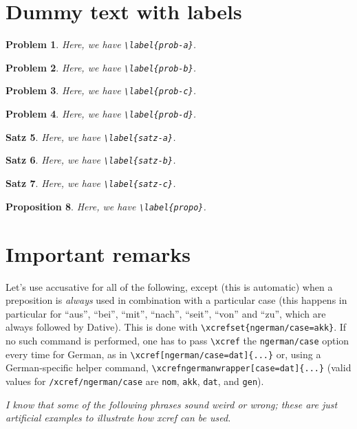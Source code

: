 \documentclass[ngerman]{article}
\newtheorem{problem}{Problem}
\newtheorem{satz}[problem]{Satz}
\newtheorem{proposition}[problem]{Proposition}
\begin{document}
\section{Dummy text with labels}
\label{sec-dummy-text-with-labels}

\begin{problem}\label{prob-a}
Here, we have \verb|\label{prob-a}|.
\end{problem}
\begin{problem}\label{prob-b}
Here, we have \verb|\label{prob-b}|.
\end{problem}
\begin{problem}\label{prob-c}
Here, we have \verb|\label{prob-c}|.
\end{problem}
\begin{problem}\label{prob-d}
Here, we have \verb|\label{prob-d}|.
\end{problem}
\begin{satz}\label{satz-a}
Here, we have \verb|\label{satz-a}|.
\end{satz}
\begin{satz}\label{satz-b}
Here, we have \verb|\label{satz-b}|.
\end{satz}
\begin{satz}\label{satz-c}
Here, we have \verb|\label{satz-c}|.
\end{satz}
\begin{proposition}\label{propo}
Here, we have \verb|\label{propo}|.
\end{proposition}

\section{Important remarks}

Let's use accusative for all of the following, except (this is automatic) when
a preposition is \emph{always} used in combination with a particular case
(this happens in particular for “aus”, “bei”, “mit”, “nach”, “seit”, “von” and
“zu”, which are always followed by Dative). This is done with
\verb|\xcrefset{ngerman/case=akk}|. If no such command is performed, one has
to pass \verb|\xcref| the \verb|ngerman/case| option every time for German, as
in \verb|\xcref[ngerman/case=dat]{...}| or, using a German-specific helper
command, \verb|\xcrefngermanwrapper[case=dat]{...}| (valid values for
\texttt{/xcref/ngerman/case} are \verb|nom|, \verb|akk|, \verb|dat|, and
\verb|gen|).

\emph{I know that some of the following phrases sound weird or wrong; these
  are just artificial examples to illustrate how \textsf{xcref} can be used.}
\end{document}
